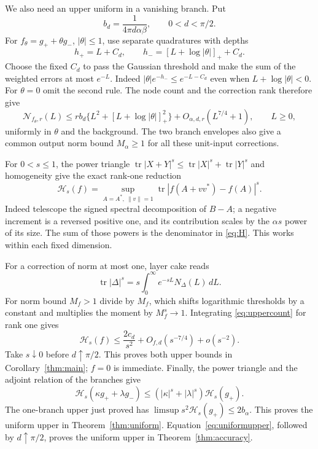 \documentclass[11pt]{article}
\numberwithin{equation}{section}
\newcommand{\tr}{\operatorname{tr}}
\newcommand{\cH}{\mathcal H}
\newcommand{\cN}{\mathcal N}
\begin{document}
We also need an upper uniform in a vanishing branch. Put
\begin{equation}\label{eq:bd}
 b_d=\frac1{4\pi d\alpha\beta},\qquad 0<d<\pi/2.
\end{equation}
For $f_\theta=g_++\theta g_-$, $|\theta|\le1$, use separate
quadratures with depths
\[
 h_+=L+C_d,\qquad h_-=[L+\log|\theta|]_++C_d.
\]
Choose the fixed $C_d$ to pass the Gaussian threshold and make the
sum of the weighted errors at most $e^{-L}$. Indeed
$|\theta|e^{-h_-}\le e^{-L-C_d}$ even when
$L+\log|\theta|<0$. For $\theta=0$ omit the second rule.
The node count and the correction rank therefore give
\begin{equation}\label{eq:uniformupper}
 \cN_{f_\theta,r}(L)\le
 r b_d\{L^2+[L+\log|\theta|]_+^2\}
       +O_{\alpha,d,r}(L^{7/4}+1),\qquad L\ge0,
\end{equation}
uniformly in $\theta$ and the background. The two branch envelopes
also give a common output norm bound $M_\alpha\ge1$ for all these
unit-input corrections.

For $0<s\le1$, the power triangle
$\tr|X+Y|^s\le\tr|X|^s+\tr|Y|^s$ and homogeneity give the exact
rank-one reduction
\begin{equation}\label{eq:rankone}
 \cH_s(f)=\sup_{A=A^*,\ \|v\|=1}
       \tr|f(A+vv^*)-f(A)|^s.
\end{equation}
Indeed telescope the signed spectral decomposition of $B-A$; a negative
increment is a reversed positive one, and its contribution scales by
the $\alpha s$ power of its size. The sum of those powers is the
denominator in \eqref{eq:H}. This works within each fixed dimension.

For a correction of norm at most one, layer cake reads
\begin{equation}\label{eq:layer}
 \tr|\Delta|^s=s\int_0^\infty e^{-sL}N_\Delta(L)\,dL.
\end{equation}
For norm bound $M_f>1$ divide by $M_f$, which shifts logarithmic
thresholds by a constant and multiplies the moment by $M_f^s\to1$.
Integrating \eqref{eq:uppercount} for rank one gives
\[
 \cH_s(f)\le\frac{2c_d}{s^2}+O_{f,d}(s^{-7/4})+o(s^{-2}).
\]
Take $s\downarrow0$ before $d\uparrow\pi/2$. This proves both upper
bounds in Corollary~\ref{thm:main}; $f=0$ is immediate.
Finally, the power triangle and the adjoint relation of the branches
give
\begin{equation}\label{eq:coefficientupper}
 \cH_s(\kappa g_++\lambda g_-)
 \le (|\kappa|^s+|\lambda|^s)\cH_s(g_+).
\end{equation}
The one-branch upper just proved has
$\limsup s^2\cH_s(g_+)\le2b_\alpha$. This proves the uniform upper
in Theorem~\ref{thm:uniform}. Equation~\eqref{eq:uniformupper}, followed
by $d\uparrow\pi/2$, proves the uniform upper in
Theorem~\ref{thm:accuracy}.
\end{document}
